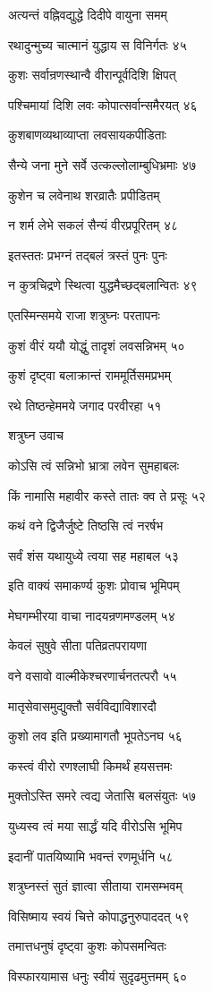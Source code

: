 अत्यन्तं वह्निवद्युद्धे दिदीपे वायुना समम्

रथादुन्मुच्य चात्मानं युद्धाय स विनिर्गतः ४५

कुशः सर्वान्रणस्थान्वै वीरान्पूर्वदिशि क्षिपत्

पश्चिमायां दिशि लवः कोपात्सर्वान्समैरयत् ४६

कुशबाणव्यथाव्याप्ता लवसायकपीडिताः

सैन्ये जना मुने सर्वे उत्कल्लोलाम्बुधिभ्रमाः ४७

कुशेन च लवेनाथ शरव्रातैः प्रपीडितम्

न शर्म लेभे सकलं सैन्यं वीरप्रपूरितम् ४८

इतस्ततः प्रभग्नं तद्बलं त्रस्तं पुनः पुनः

न कुत्रचिद्रणे स्थित्वा युद्धमैच्छद्बलान्वितः ४९

एतस्मिन्समये राजा शत्रुघ्नः परतापनः

कुशं वीरं ययौ योद्धुं तादृशं लवसन्निभम् ५०

कुशं दृष्ट्वा बलाक्रान्तं राममूर्तिसमप्रभम्

रथे तिष्ठन्हेममये जगाद परवीरहा ५१

शत्रुघ्न उवाच

कोऽसि त्वं सन्निभो भ्रात्रा लवेन सुमहाबलः

किं नामासि महावीर कस्ते तातः क्व ते प्रसूः ५२

कथं वने द्विजैर्जुष्टे तिष्ठसि त्वं नरर्षभ

सर्वं शंस यथायुध्ये त्वया सह महाबल ५३

इति वाक्यं समाकर्ण्य कुशः प्रोवाच भूमिपम्

मेघगम्भीरया वाचा नादयन्रणमण्डलम् ५४

केवलं सुषुवे सीता पतिव्रतपरायणा

वने वसावो वाल्मीकेश्चरणार्चनतत्परौ ५५

मातृसेवासमुद्युक्तौ सर्वविद्याविशारदौ

कुशो लव इति प्रख्यामागतौ भूपतेऽनघ ५६

कस्त्वं वीरो रणश्लाघी किमर्थं हयसत्तमः

मुक्तोऽस्ति समरे त्वद्य जेतासि बलसंयुतः ५७

युध्यस्व त्वं मया सार्द्धं यदि वीरोऽसि भूमिप

इदानीं पातयिष्यामि भवन्तं रणमूर्धनि ५८

शत्रुघ्नस्तं सुतं ज्ञात्वा सीताया रामसम्भवम्

विसिष्माय स्वयं चित्ते कोपाद्धनुरुपाददत् ५९

तमात्तधनुषं दृष्ट्वा कुशः कोपसमन्वितः

विस्फारयामास धनुः स्वीयं सुदृढमुत्तमम् ६०

